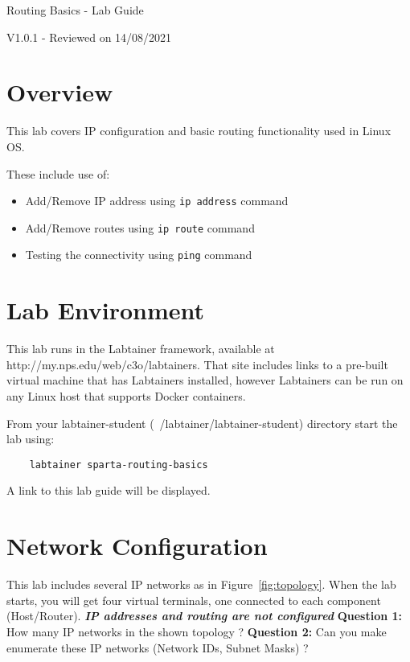 


\begin{center}
{\LARGE Routing Basics - Lab Guide}

V1.0.1 - Reviewed on 14/08/2021
\vspace{0.1in}\\
\end{center}

\copyrightnotice

\section{Overview}
This lab covers IP configuration and basic routing functionality used in Linux OS.

These include use of:
\begin{itemize}
	\item Add/Remove IP address using \texttt{ip address} command
	\item Add/Remove routes using \texttt{ip route} command
	\item Testing the connectivity using \texttt{ping} command
\end{itemize}

\section{Lab Environment}
This lab runs in the Labtainer framework,
available at http://my.nps.edu/web/c3o/labtainers.
That site includes links to a pre-built virtual machine
that has Labtainers installed, however Labtainers can
be run on any Linux host that supports Docker containers.

From your labtainer-student (~/labtainer/labtainer-student) directory start the lab using:
\begin{verbatim}
    labtainer sparta-routing-basics
\end{verbatim}
\noindent A link to this lab guide will be displayed.

\section{Network Configuration}
This lab includes several IP networks as in Figure~\ref{fig:topology}.
When the lab starts, you will get four virtual terminals, one connected to each component (Host/Router).
\newline
\newline
\textbf{\textit{IP addresses and routing are not configured}}
\newline
\newline
\textbf{Question 1:}
How many IP networks in the shown topology ?
\newline
\newline
\textbf{Question 2:}
Can you make enumerate these IP networks (Network IDs, Subnet Masks) ?
\newline
\newline

